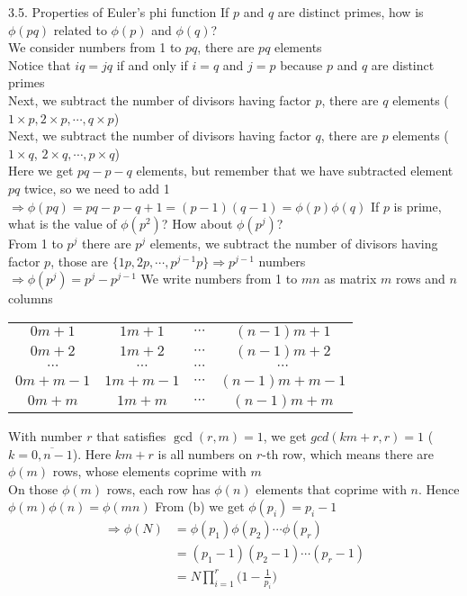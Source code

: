 3.5. Properties of Euler's phi function
		 If $p$ and $q$ are distinct primes, how is $\phi(pq)$ related to $\phi(p)$ and $\phi(q)$? \\ We consider numbers from 1 to $pq$, there are $pq$ elements \\ Notice that $iq = jq$ if and only if $i=q$ and $j=p$ because $p$ and $q$ are distinct primes \\ Next, we subtract the number of divisors having factor $p$, there are $q$ elements ($1 \times p, 2 \times p, \cdots, q \times p$) \\ Next, we subtract the number of divisors having factor $q$, there are $p$ elements ($1 \times q$, $2 \times q, \cdots, p \times q$) \\ Here we get $pq - p - q$ elements, but remember that we have subtracted element $pq$ twice, so we need to add 1 \\ $\Rightarrow \phi(pq) = pq - p - q + 1 = (p-1)(q-1) = \phi(p)\phi(q)$
		 If $p$ is prime, what is the value of $\phi(p^2)$? How about $\phi(p^j)$? \\ From 1 to $p^j$ there are $p^j$ elements, we subtract the number of divisors having factor $p$, those are $\{1p, 2p, \cdots, p^{j-1}p\} \Rightarrow p^{j-1}$ numbers \\ $\Rightarrow \phi(p^j) = p^j - p^{j-1}$
		 We write numbers from 1 to $mn$ as matrix $m$ rows and $n$ columns
		\begin{center}
			\begin{tabular}{c c c c}
				$0m+1$ & $1m+1$ & $\cdots$ & $(n-1)m+1$ \\ 
				$0m+2$ & $1m+2$ & $\cdots$ & $(n-1)m+2$ \\ 
				$\cdots$ & $\cdots$ & $\cdots$ & $\cdots$ \\ 
				$0m + m-1$ & $1m + m-1$ & $\cdots$ & $(n-1)m + m - 1$ \\
				$0m + m$ & $1 m + m$ & $\cdots$ & $(n-1)m + m$
			\end{tabular}
		\end{center}
		With number $r$ that satisfies $\gcd(r,m)=1$, we get $gcd(km+r,r)=1$ ($k=\overline{0, n-1}$). Here $km+r$ is all numbers on $r$-th row, which means there are $\phi(m)$ rows, whose elements coprime with $m$ \\ On those $\phi(m)$ rows, each row has $\phi(n)$ elements that coprime with $n$. Hence $\phi(m)\phi(n)=\phi(mn)$
		 From (b) we get $\phi(p_i) = p_i - 1$
		\begin{align*}
			\Rightarrow \phi(N) & = \phi(p_1)\phi(p_2)\cdots\phi(p_r) \\ & = (p_1 - 1)(p_2 -1)\cdots(p_r-1) \\ & = N\prod_{i=1}^{r}\Bigg(1-\frac{1}{p_i}\Bigg)
		\end{align*}
	


